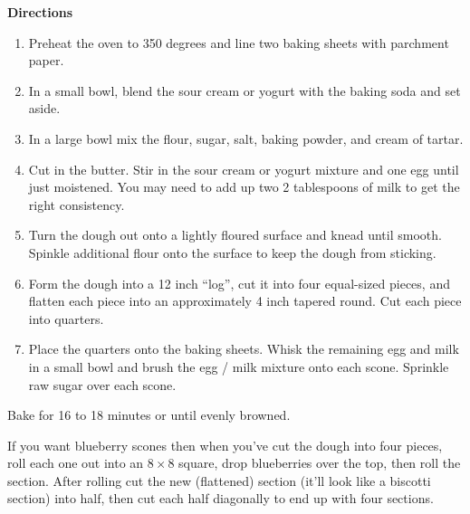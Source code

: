 \documentclass{article}
\begin{document}
\textbf{Directions}

\begin{enumerate}
      \item{Preheat the oven to 350 degrees and line two baking sheets with parchment paper.}
      \item{In a small bowl, blend the sour cream or yogurt with the baking soda and set aside.}
      \item{In a large bowl mix the flour, sugar, salt, baking powder, and cream of tartar.}
      \item{Cut in the butter. Stir in the sour cream or yogurt mixture and one egg until just moistened.
                  You may need to add up two 2 tablespoons of milk to get the right consistency.}
      \item{Turn the dough out onto a lightly floured surface and knead until smooth. Spinkle additional
                  flour onto the surface to keep the dough from sticking.}
      \item{Form the dough into a 12 inch ``log'', cut it into four equal-sized pieces, and flatten
                  each piece into an approximately 4 inch tapered round. Cut each piece into quarters.}
      \item{Place the quarters onto the baking sheets. Whisk the remaining egg and milk in a small bowl
                  and brush the egg / milk mixture onto each scone. Sprinkle raw sugar over each scone.}
\end{enumerate}

\bigskip

Bake for 16 to 18 minutes or until evenly browned.

If you want blueberry scones then when you've cut the dough
into four pieces, roll each one out into an $8\times8$ square,
drop blueberries over the top, then roll the section. After
rolling cut the new (flattened) section (it'll look like a
biscotti section) into half, then cut each half diagonally
to end up with four sections.

\end{document}
